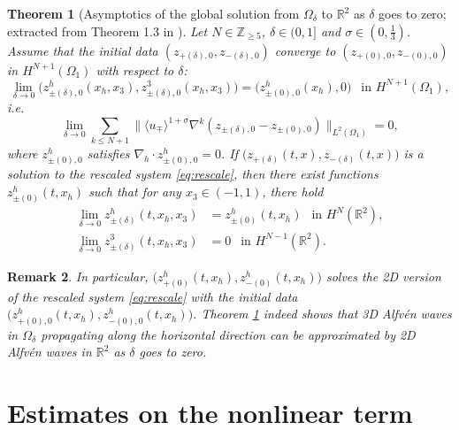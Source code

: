 \documentclass[10pt,reqno]{amsart}
\numberwithin{equation}{section}
\newtheorem{theorem}{Theorem}[section]
\newtheorem{remark}[theorem]{Remark}
\begin{document}
\begin{theorem}[Asymptotics of the global solution  from $\Omega_{\delta}$ to $\mathbb{R}^2$ as  $\delta$ goes to zero; extracted from Theorem 1.3 in \cite{Xu}] 
	\label{lemma:approx}
	Let $N\in \mathbb{Z}_{\geqslant 5}$, $\delta\in(0,1]$ and  $\sigma\in(0,\frac{1}{3})$.  
	Assume that   
	the initial data $(z_{+(\delta),0},z_{-(\delta),0})$ converge to $(z_{+(0),0},z_{-(0),0})$ in $H^{N+1}(\Omega_1)$
	with respect to $\delta$:
	\begin{equation*}
		\lim_{\delta\to 0}	\big(z_{\pm(\delta),0}^h(x_h,x_3),z_{\pm(\delta),0}^3(x_h,x_3)\big)
	=\big(z_{\pm(0),0}^h(x_h),0\big)\ \ \text{ in }H^{N+1}(\Omega_1),
\end{equation*}
i.e. 
\begin{equation*}
	\lim_{\delta\to 0}\sum_{k\leqslant N+1}\big\|\langle u_\mp\rangle^{1+\sigma}\nabla^k(z_{\pm(\delta),0} -z_{\pm(0),0} )\big\|_{L^2(\Omega_1)}=0,
\end{equation*}
where $z_{\pm(0),0}^h$ satisfies $\nabla_h\cdot z_{\pm(0),0}^h=0$. 
If $\big(z_{+(\delta)}(t,x),z_{-(\delta)}(t,x)\big)$ is a solution to the rescaled system  \eqref{eq:rescale}, then there exist functions $z_{\pm(0)}^h(t,x_h)$ such that for any $x_3\in(-1,1)$, there hold
\begin{equation*}
	\begin{split}
		\lim_{\delta\to 0}z_{\pm(\delta)}^h(t,x_h,x_3)&=z_{\pm(0)}^h(t,x_h)\ \ \text{ in }H^N(\mathbb{R}^2),\\
		\lim_{\delta\to 0}z_{\pm(\delta)}^3(t,x_h,x_3)&=0\ \ \text{ in }H^{N-1}(\mathbb{R}^2).
\end{split}\end{equation*}
\end{theorem}

\begin{remark}
In particular, $\big(z_{+(0)}^h(t,x_h),z_{-(0)}^h(t,x_h)\big)$ solves the 2D version of the rescaled system \eqref{eq:rescale} with the initial data $\big(z_{+(0),0}^h(t,x_h),z_{-(0),0}^h(t,x_h)\big)$. Theorem \ref{lemma:approx} indeed shows that 3D Alfv\'en waves in $\Omega_\delta$ propagating along the horizontal direction can be approximated by 2D Alfv\'en waves in $\mathbb{R}^2$ as
$\delta$ goes to zero. 
\end{remark}





\section{Estimates on the nonlinear term}\label{sec:more estimates}
\end{document}
